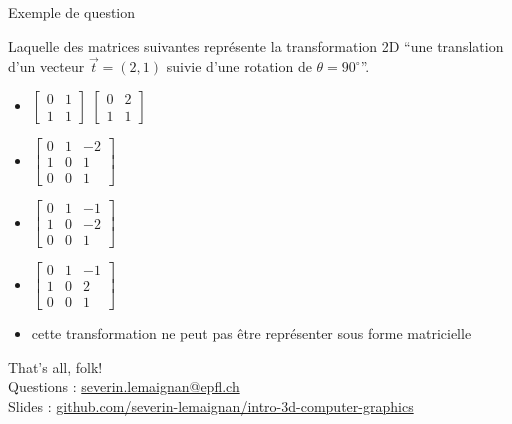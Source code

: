\documentclass[compress]{beamer}
\begin{document}
\begin{frame}{Exemple de question}

Laquelle des matrices suivantes représente la transformation 2D ``une translation
d'un vecteur $\vec t = (2,1)$ suivie d'une rotation de $\theta = 90^{\circ}$''.

\begin{itemize}
    \item $\begin{bmatrix} 0 & 1 \\ 1 & 1 \end{bmatrix}$ $\begin{bmatrix} 0 & 2 \\ 1 & 1 \end{bmatrix}$
    \item $\begin{bmatrix} 0 & 1 & -2 \\ 1 & 0 & 1 \\ 0 & 0 & 1 \end{bmatrix}$
    \item $\begin{bmatrix} 0 & 1 & -1 \\ 1 & 0 & -2 \\ 0 & 0 & 1 \end{bmatrix}$
    \item $\begin{bmatrix} 0 & 1 & -1 \\ 1 & 0 & 2 \\ 0 & 0 & 1 \end{bmatrix}$
    \item cette transformation ne peut pas être représenter sous forme
        matricielle 
\end{itemize}


\end{frame}

\begin{frame}{}
    \begin{center}
        \Large
        That's all, folk!\\[2em]
        \normalsize
        Questions : \url{severin.lemaignan@epfl.ch} \\
        Slides : \url{github.com/severin-lemaignan/intro-3d-computer-graphics}
    \end{center}
\end{frame}
\end{document}

